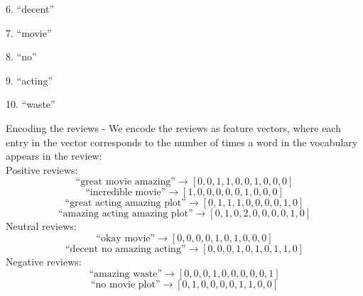 \documentclass[a3paper,12pt]{extarticle} %
\begin{document}
6. ``decent''

7. ``movie''

8. ``no''

9. ``acting''

10. ``waste''

\[\]
Encoding the reviews - We encode the reviews as feature vectors, where each entry in the vector corresponds to the number of times a word in the vocabulary appears in the review:
\\ Positive reviews:
\[
\text{``great movie amazing''} \rightarrow [0, 0, 1, 1, 0, 0, 1, 0, 0, 0]
\]
\[
\text{``incredible movie''} \rightarrow [1, 0, 0, 0, 0, 0, 1, 0, 0, 0]
\]
\[
\text{``great acting amazing plot''} \rightarrow [0, 1, 1, 1, 0, 0, 0, 0, 1, 0]
\]
\[
\text{``amazing acting amazing plot''} \rightarrow [0, 1, 0, 2, 0, 0, 0, 0, 1, 0]
\]
Neutral reviews:
\[
\text{``okay movie''} \rightarrow [0, 0, 0, 0, 1, 0, 1, 0, 0, 0]
\]
\[
\text{``decent no amazing acting''} \rightarrow [0, 0, 0, 1, 0, 1, 0, 1, 1, 0]
\]
Negative reviews:
\[
\text{``amazing waste''} \rightarrow [0, 0, 0, 1, 0, 0, 0, 0, 0, 1]
\]
\[
\text{``no movie plot''} \rightarrow [0, 1, 0, 0, 0, 0, 1, 1, 0, 0]
\]
\end{document}
